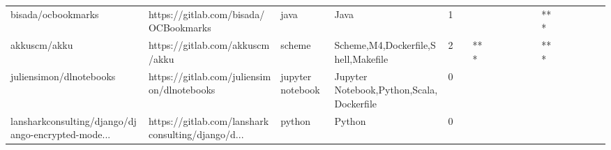 \begin{tabular}{llllrlllllllllllll}
bisada/ocbookmarks                                 &              https://gitlab.com/bisada/OCBookmarks &              java &                                               Java &       1 &         &        &           &                &                 &        &           &       *** &          &          &       &              &          \\
akkuscm/akku                                       &                    https://gitlab.com/akkuscm/akku &            scheme &                Scheme,M4,Dockerfile,Shell,Makefile &       2 &         &    *** &           &                &                 &        &           &       *** &          &          &       &              &          \\
juliensimon/dlnotebooks                            &         https://gitlab.com/juliensimon/dlnotebooks &  jupyter notebook &           Jupyter Notebook,Python,Scala,Dockerfile &       0 &         &        &           &                &                 &        &           &           &          &          &       &              &          \\
lansharkconsulting/django/django-encrypted-mode... &  https://gitlab.com/lansharkconsulting/django/d... &            python &                                             Python &       0 &         &        &           &                &                 &        &           &           &          &          &       &              &          \\
\bottomrule
\end{tabular}
